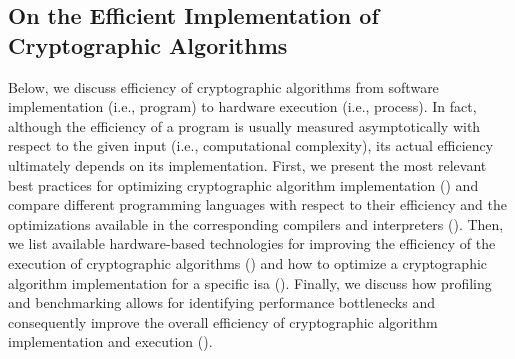 \subsection{On the Efficient Implementation of Cryptographic Algorithms}\label{sec:security_of_cryptographic_algorithms:performance}




Below, we discuss efficiency of cryptographic algorithms from software implementation (i.e., program) to hardware execution (i.e., process). In fact, although the efficiency of a program is usually measured asymptotically with respect to the given input (i.e., computational complexity), its actual efficiency ultimately depends on its implementation. First, we present the most relevant best practices for optimizing cryptographic algorithm implementation () and compare  different programming languages with respect to their efficiency and the optimizations available in the corresponding compilers and interpreters (). Then, we list available hardware-based technologies for improving the efficiency of the execution of cryptographic algorithms () and how to optimize a cryptographic algorithm implementation for a specific \gls{isa} (). Finally, we discuss how profiling and benchmarking allows for identifying performance bottlenecks and consequently improve the overall efficiency of cryptographic algorithm implementation and execution ().



